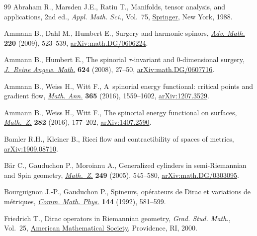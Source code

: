 \documentclass[11pt]{article}
\numberwithin{equation}{section}
\newcommand\<{\langle}
\renewcommand\>{\rangle}
\theoremstyle{definition}
\newcommand\={\,=\,}
\numberwithin{equation}{section}
\begin{document}
\begin{thebibliography}{99}
Abraham R., Marsden J.E., Ratiu T., Manifolds, tensor analysis, and
 applications, 2nd ed., \textit{Appl. Math. Sci.}, Vol.~75,
 \href{https://doi.org/10.1007/978-1-4612-1029-0}{Springer}, New York, 1988.

Ammann B., Dahl M., Humbert E., Surgery and harmonic spinors,
 \href{https://doi.org/10.1016/j.aim.2008.09.013}{\textit{Adv. Math.}}
 \textbf{220} (2009), 523--539,
 \href{http://arxiv.org/abs/math.DG/0606224}{arXiv:math.DG/0606224}.

Ammann B., Humbert E., The spinorial {$\tau$}-invariant and 0-dimensional
 surgery, \href{https://doi.org/10.1515/CRELLE.2008.079}{\textit{J.~Reine
 Angew. Math.}} \textbf{624} (2008), 27--50,
 \href{http://arxiv.org/abs/math.DG/0607716}{arXiv:math.DG/0607716}.

Ammann B., Weiss H., Witt F., A~spinorial energy functional: critical points
 and gradient flow,
 \href{https://doi.org/10.1007/s00208-015-1315-8}{\textit{Math. Ann.}}
 \textbf{365} (2016), 1559--1602,
 \href{http://arxiv.org/abs/1207.3529}{arXiv:1207.3529}.

Ammann B., Weiss H., Witt F., The spinorial energy functional on surfaces,
 \href{https://doi.org/10.1007/s00209-015-1537-1}{\textit{Math.~Z.}}
 \textbf{282} (2016), 177--202,
 \href{http://arxiv.org/abs/1407.2590}{arXiv:1407.2590}.

Bamler R.H., Kleiner B., {R}icci flow and contractibility of spaces of metrics,
 \href{http://arxiv.org/abs/1909.08710}{arXiv:1909.08710}.

B\"ar C., Gauduchon P., Moroianu A., Generalized cylinders in semi-{R}iemannian
 and {S}pin geometry,
 \href{https://doi.org/10.1007/s00209-004-0718-0}{\textit{Math.~Z.}}
 \textbf{249} (2005), 545--580,
 \href{http://arxiv.org/abs/math.DG/0303095}{arXiv:math.DG/0303095}.

Bourguignon J.-P., Gauduchon P., Spineurs, op\'erateurs de {D}irac et variations
 de m\'etriques, \href{https://doi.org/10.1007/BF02099184}{\textit{Comm. Math.
 Phys.}} \textbf{144} (1992), 581--599.

Friedrich T., Dirac operators in {R}iemannian geometry, \textit{Grad. Stud.
 Math.}, Vol.~25, \href{https://doi.org/10.1090/gsm/025}{American Mathematical
 Society}, Providence, RI, 2000.


\end{thebibliography}
\end{document}
